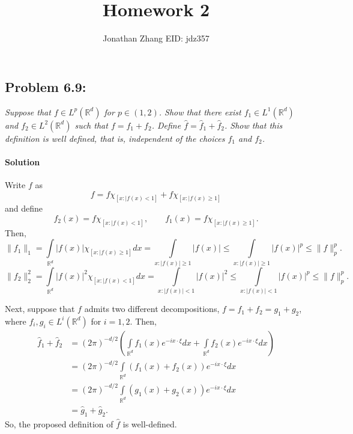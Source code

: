 \documentclass[letterpaper,twoside,11pt]{article}
\theoremstyle{mystyle}
\newcommand{\R}{{\mathbb R}}
\begin{document}
\title{\vspace{-2\baselineskip} 
Homework 2
}
\author{Jonathan Zhang \qquad EID: { jdz357} }
\date{}
\maketitle


\subsection*{Problem 6.9:}
\textit{
Suppose that $f\in L^p\left( \R^d \right)$ for $p \in \left( 1, 2 \right)$. Show that there exist $f_1 \in L^1\left( \R^d \right)$ and $f_2 \in L^2\left( \R^d \right)$ such that $f = f_1 + f_2$. 
Define $\hat f = \hat f_1 + \hat f_2$. Show that this definition is well defined, that is, independent of the choices $f_1$ and $f_2$. }

\paragraph*{Solution}
Write $f$ as 
\[f = f\chi_{[x:|f(x)<1]} + f\chi_{[x:|f(x)\geqslant 1]}\]
and define 
\[f_2(x) = f\chi_{[x:|f(x)<1]},\qquad f_1(x) = f\chi_{[x:|f(x)\geqslant 1]}.\]
Then, 
\[\|f_1\|_1 = \int\limits_{\R^d} |f(x)|\chi_{[x:|f(x)\geqslant 1]}dx = \int\limits_{x:|f(x)|\geqslant 1}|f(x)| \leq\int\limits_{x:|f(x)|\geqslant 1}|f(x)|^p \leq \|f\|_p^p. \]
\[\|f_2\|_2^2 = \int\limits_{\R^d} |f(x)|^2\chi_{[x:|f(x)< 1]}dx = \int\limits_{x:|f(x)|< 1}|f(x)|^2 \leq\int\limits_{x:|f(x)|< 1}|f(x)|^p \leq \|f\|_p^p. \]

Next, suppose that $f$ admits two different decompositions, $f = f_1 + f_2 = g_1 + g_2$, where $f_i, g_i \in L^i\left( \R^d \right)$ for $i = 1, 2$. Then, 
\begin{align*}
\hat f_1 + \hat f_2 &= \left( 2\pi \right)^{-d/2}\left(\int\limits_{\R^d} f_1(x) e^{-ix\cdot \xi } dx+\int\limits_{\R^d} f_2(x) e^{-ix\cdot \xi } dx \right)\\
&=\left( 2\pi \right)^{-d/2} \int\limits_{\R^d} \left( f_1(x) + f_2(x)  \right)e^{-ix\cdot \xi }dx\\
&=\left( 2\pi \right)^{-d/2} \int\limits_{\R^d} \left( g_1(x) + g_2(x)  \right)e^{-ix\cdot \xi }dx\\
&=\hat g_1 + \hat g_2.
\end{align*}
So, the proposed definition of $\hat f$ is well-defined. 
\end{document}
